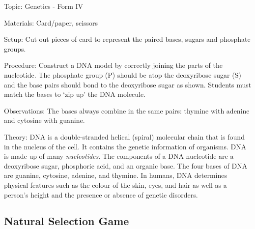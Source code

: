 \begin{multicols}{2}
\begin{description*}
\item[Topic:]{Genetics - Form IV}
\item[Materials:]{Card/paper, scissors}
\item[Setup:]{Cut out pieces of card to
represent the paired bases, sugars and phosphate groups.}
\item[Procedure:]{Construct a DNA model by correctly joining the parts of the nucleotide. The phosphate group (P) should be atop the deoxyribose sugar (S) and the
base pairs should bond to the deoxyribose sugar as shown. Students must match the bases to
`zip up' the DNA molecule.}
\item[Observations:]{The bases
always combine in the same pairs:
thymine with adenine and
cytosine with guanine.}
\item[Theory:]{DNA is a double-stranded helical (spiral) molecular chain that is found in the nucleus of the cell. It contains the genetic information of organisms. DNA is made up of many \emph{nucleotides}. The components of a DNA nucleotide are a deoxyribose sugar, phosphoric acid, and an organic base. The four bases of DNA are guanine, cytosine, adenine, and thymine. In humans, DNA determines physical features such as the colour of the skin, eyes, and hair as well as a person's height and the presence or absence of genetic disorders.}
\end{description*}

\subsection{Natural Selection Game} %



\end{multicols}
